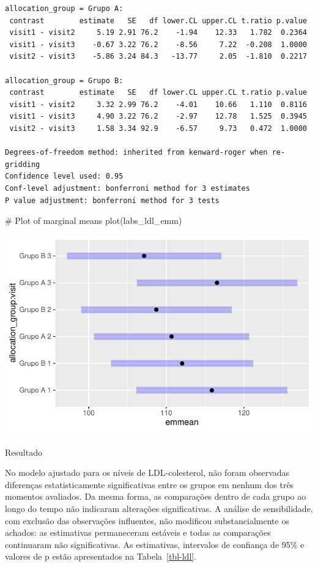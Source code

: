 \documentclass[
  12pt,
]{article}
\makeatletter
\let\oldparagraph\paragraph
\renewcommand{\paragraph}{
    \@ifstar
      \xxxParagraphStar
      \xxxParagraphNoStar
  }
\newcommand{\xxxParagraphStar}[1]{\oldparagraph*{#1}\mbox{}}
\newcommand{\xxxParagraphNoStar}[1]{\oldparagraph{#1}\mbox{}}
\newenvironment{Shaded}{\begin{snugshade}}{\end{snugshade}}
\newcommand{\CommentTok}[1]{\textcolor[rgb]{0.37,0.37,0.37}{#1}}
\newcommand{\FunctionTok}[1]{\textcolor[rgb]{0.28,0.35,0.67}{#1}}
\newcommand{\NormalTok}[1]{\textcolor[rgb]{0.00,0.23,0.31}{#1}}
\makeatother
\begin{document}
\begin{verbatim}
allocation_group = Grupo A:
 contrast        estimate   SE   df lower.CL upper.CL t.ratio p.value
 visit1 - visit2     5.19 2.91 76.2    -1.94    12.33   1.782  0.2364
 visit1 - visit3    -0.67 3.22 76.2    -8.56     7.22  -0.208  1.0000
 visit2 - visit3    -5.86 3.24 84.3   -13.77     2.05  -1.810  0.2217

allocation_group = Grupo B:
 contrast        estimate   SE   df lower.CL upper.CL t.ratio p.value
 visit1 - visit2     3.32 2.99 76.2    -4.01    10.66   1.110  0.8116
 visit1 - visit3     4.90 3.22 76.2    -2.97    12.78   1.525  0.3945
 visit2 - visit3     1.58 3.34 92.9    -6.57     9.73   0.472  1.0000

Degrees-of-freedom method: inherited from kenward-roger when re-gridding 
Confidence level used: 0.95 
Conf-level adjustment: bonferroni method for 3 estimates 
P value adjustment: bonferroni method for 3 tests 
\end{verbatim}

\begin{Shaded}
\begin{Highlighting}[]
\CommentTok{\# Plot of marginal means}
\FunctionTok{plot}\NormalTok{(labs\_ldl\_emm)}
\end{Highlighting}
\end{Shaded}

\includegraphics{Outcomes_files/figure-pdf/labs_ldl_sens_emm-1.pdf}

\paragraph{Resultado}\label{resultado-5}

No modelo ajustado para os níveis de LDL-colesterol, não foram
observadas diferenças estatisticamente significativas entre os grupos em
nenhum dos três momentos avaliados. Da mesma forma, as comparações
dentro de cada grupo ao longo do tempo não indicaram alterações
significativas. A análise de sensibilidade, com exclusão das observações
influentes, não modificou substancialmente os achados: as estimativas
permaneceram estáveis e todas as comparações continuaram não
significativas. As estimativas, intervalos de confiança de 95\% e
valores de p estão apresentados na Tabela~\ref{tbl-ldl}.
\end{document}
